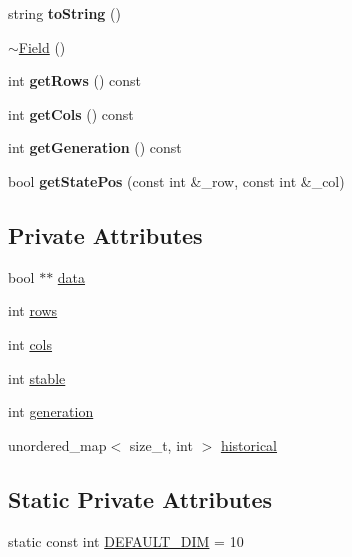 \begin{DoxyCompactItemize}
\item 
string {\bfseries to\+String} ()\hypertarget{classField_aefecec2cf434f89b09d584cff80c8951}{}\label{classField_aefecec2cf434f89b09d584cff80c8951}

\item 
\hyperlink{classField_a45d6e6d09b8f8e46de62b40119d62c60}{$\sim$\+Field} ()
\item 
int {\bfseries get\+Rows} () const \hypertarget{classField_ae585f252de1b8fb4b90fd3424faa8e62}{}\label{classField_ae585f252de1b8fb4b90fd3424faa8e62}

\item 
int {\bfseries get\+Cols} () const \hypertarget{classField_a453287eda20027f08bf0f47033e13423}{}\label{classField_a453287eda20027f08bf0f47033e13423}

\item 
int {\bfseries get\+Generation} () const \hypertarget{classField_aba0ae2354fad38ef65ba45dd63c0f788}{}\label{classField_aba0ae2354fad38ef65ba45dd63c0f788}

\item 
bool {\bfseries get\+State\+Pos} (const int \&\+\_\+row, const int \&\+\_\+col)\hypertarget{classField_ae96f8883d511c998bdb984ffee5dafa5}{}\label{classField_ae96f8883d511c998bdb984ffee5dafa5}

\end{DoxyCompactItemize}
\subsection*{Private Attributes}
\begin{DoxyCompactItemize}
\item 
bool $\ast$$\ast$ \hyperlink{classField_a887a35d633c25fb24bb5a1d77b5e129c}{data}
\item 
int \hyperlink{classField_a2a605fd2464725d8bd67b7cd4adfeb38}{rows}
\item 
int \hyperlink{classField_a61aa18e6c351c3d70bc815056ef81751}{cols}
\item 
int \hyperlink{classField_a7ffef1a2d4f61e0d7bc628a6183530e1}{stable}
\item 
int \hyperlink{classField_abf1358100ec5a7746c0467f25db50eac}{generation}
\item 
unordered\+\_\+map$<$ size\+\_\+t, int $>$ \hyperlink{classField_aef4dbb5a7a3eceee6a2fff882ab787df}{historical}
\end{DoxyCompactItemize}
\subsection*{Static Private Attributes}
\begin{DoxyCompactItemize}
\item 
static const int \hyperlink{classField_add3cd7850a250739b0eb08caf41427da}{D\+E\+F\+A\+U\+L\+T\+\_\+\+D\+IM} = 10
\end{DoxyCompactItemize}



